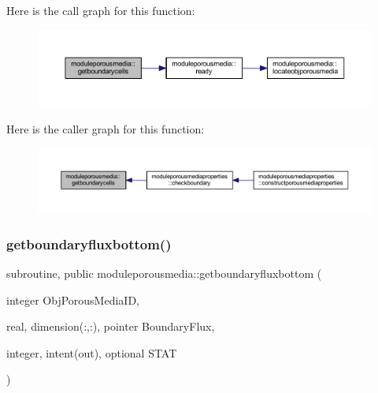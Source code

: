 Here is the call graph for this function\+:\nopagebreak
\begin{figure}[H]
\begin{center}
\leavevmode
\includegraphics[width=350pt]{namespacemoduleporousmedia_a791a426544d46967cd83d7b81926e26a_cgraph}
\end{center}
\end{figure}
Here is the caller graph for this function\+:\nopagebreak
\begin{figure}[H]
\begin{center}
\leavevmode
\includegraphics[width=350pt]{namespacemoduleporousmedia_a791a426544d46967cd83d7b81926e26a_icgraph}
\end{center}
\end{figure}
\mbox{\label{namespacemoduleporousmedia_ad1e02ec3a85b11609df54fd2e561da0d}} 
\subsubsection{\texorpdfstring{getboundaryfluxbottom()}{getboundaryfluxbottom()}}
{\footnotesize\ttfamily subroutine, public moduleporousmedia\+::getboundaryfluxbottom (\begin{DoxyParamCaption}\item[{integer}]{Obj\+Porous\+Media\+ID,  }\item[{real, dimension(\+:,\+:), pointer}]{Boundary\+Flux,  }\item[{integer, intent(out), optional}]{S\+T\+AT }\end{DoxyParamCaption})}

